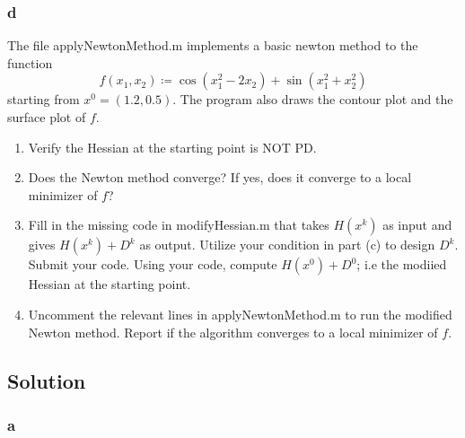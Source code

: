 \documentclass[11pt]{report}
\theoremstyle{definition}
\begin{document}
\subsubsection*{d}
The file applyNewtonMethod.m implements a basic newton method to the function
\[f(x_1, x_2)\coloneqq \cos(x_1^2-2x_2)+\sin(x_1^2+x_2^2)\]
starting from $x^0=(1.2,0.5)$. The program also draws the contour plot and the surface plot of $f$.
\begin{enumerate}
	\item Verify the Hessian at the starting point is NOT PD.
	\item Does the Newton method converge? If yes, does it converge to a local
	      minimizer of $f$?
	\item Fill in the missing code in modifyHessian.m that takes $H(x^k)$ as
	      input and gives $H(x^k)+D^k$ as output. Utilize your condition in part
	      (c) to design $D^k$. Submit your code. Using your code, compute
	      $H(x^0)+D^0$; i.e the modiied Hessian at the starting point.
	\item Uncomment the relevant lines in applyNewtonMethod.m to run the
	      modified Newton method. Report if the algorithm converges to a local
	      minimizer of $f$.
\end{enumerate}

\subsection*{Solution}
\subsubsection*{a}


\end{document}
